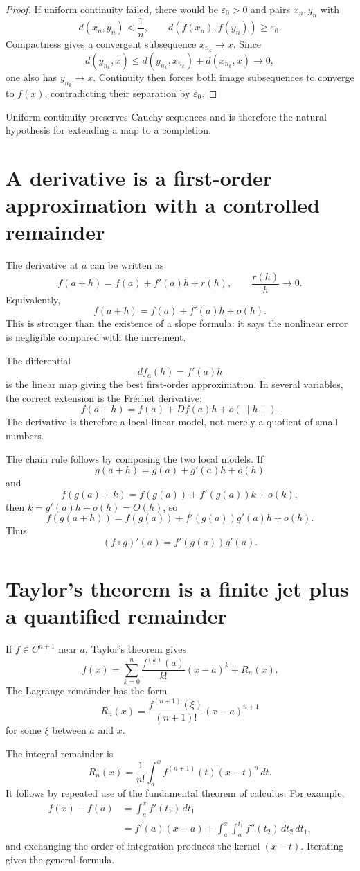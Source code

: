 \begin{proof}
If uniform continuity failed, there would be \(\varepsilon_0>0\) and pairs \(x_n,y_n\) with
\[
  d(x_n,y_n)<\frac1n,
  \qquad
  d(f(x_n),f(y_n))\ge\varepsilon_0.
\]
Compactness gives a convergent subsequence \(x_{n_k}\to x\).  Since
\[
  d(y_{n_k},x)
  \le d(y_{n_k},x_{n_k})+d(x_{n_k},x)
  \to0,
\]
one also has \(y_{n_k}\to x\).  Continuity then forces both image subsequences to converge to \(f(x)\), contradicting their separation by \(\varepsilon_0\).
\end{proof}

Uniform continuity preserves Cauchy sequences and is therefore the natural hypothesis for extending a map to a completion.

\section{A derivative is a first-order approximation with a controlled remainder}

The derivative at \(a\) can be written as
\[
  f(a+h)=f(a)+f'(a)h+r(h),
  \qquad
  \frac{r(h)}{h}\to0.
\]
Equivalently,
\[
  f(a+h)=f(a)+f'(a)h+o(h).
\]
This is stronger than the existence of a slope formula: it says the nonlinear error is negligible compared with the increment.

The differential
\[
  df_a(h)=f'(a)h
\]
is the linear map giving the best first-order approximation.  In several variables, the correct extension is the Fréchet derivative:
\[
  f(a+h)=f(a)+Df(a)h+o(\|h\|).
\]
The derivative is therefore a local linear model, not merely a quotient of small numbers.

The chain rule follows by composing the two local models.  If
\[
  g(a+h)=g(a)+g'(a)h+o(h)
\]
and
\[
  f(g(a)+k)=f(g(a))+f'(g(a))k+o(k),
\]
then \(k=g'(a)h+o(h)=O(h)\), so
\[
  f(g(a+h))
  =f(g(a))+f'(g(a))g'(a)h+o(h).
\]
Thus
\[
  (f\circ g)'(a)=f'(g(a))g'(a).
\]

\section{Taylor's theorem is a finite jet plus a quantified remainder}

If \(f\in C^{n+1}\) near \(a\), Taylor's theorem gives
\[
  f(x)
  =\sum_{k=0}^n
  \frac{f^{(k)}(a)}{k!}(x-a)^k
  +R_n(x).
\]
The Lagrange remainder has the form
\[
  R_n(x)
  =\frac{f^{(n+1)}(\xi)}{(n+1)!}(x-a)^{n+1}
\]
for some \(\xi\) between \(a\) and \(x\).

The integral remainder is
\[
  \boxed{
  R_n(x)
  =\frac1{n!}
  \int_a^x f^{(n+1)}(t)(x-t)^n\,dt.}
\]
It follows by repeated use of the fundamental theorem of calculus.  For example,
\[
\begin{aligned}
  f(x)-f(a)
  &=\int_a^x f'(t_1)\,dt_1\\
  &=f'(a)(x-a)
  +\int_a^x\int_a^{t_1}f''(t_2)\,dt_2\,dt_1,
\end{aligned}
\]
and exchanging the order of integration produces the kernel \((x-t)\).  Iterating gives the general formula.

